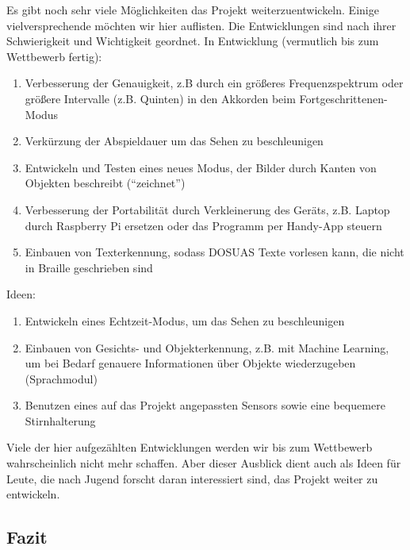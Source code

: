 \documentclass[a4paper,12pt,ngerman]{scrartcl}
\begin{document}
Es gibt noch sehr viele Möglichkeiten das Projekt weiterzuentwickeln. Einige vielversprechende
möchten wir hier auflisten. Die Entwicklungen sind nach ihrer Schwierigkeit und Wichtigkeit geordnet.
In Entwicklung (vermutlich bis zum Wettbewerb fertig):
\begin{enumerate}
	\item Verbesserung der Genauigkeit, z.B durch ein größeres Frequenzspektrum oder größere Intervalle (z.B. Quinten) in den
	 Akkorden beim Fortgeschrittenen-Modus
	\item Verkürzung der Abspieldauer um das Sehen zu beschleunigen
	\item Entwickeln und Testen eines neues Modus, der Bilder durch Kanten von Objekten beschreibt (\enquote{zeichnet}) 
	\item Verbesserung der Portabilität durch Verkleinerung des Geräts, z.B. Laptop durch Raspberry Pi ersetzen oder das Programm per
	Handy-App steuern
	\item Einbauen von Texterkennung, sodass DOSUAS Texte vorlesen kann, die nicht in Braille geschrieben sind
\end{enumerate}
Ideen:
\begin{enumerate} 
	\item Entwickeln eines Echtzeit-Modus, um das Sehen zu beschleunigen
	\item Einbauen von Gesichts- und Objekterkennung, z.B. mit Machine Learning, um bei Bedarf genauere 
	Informationen über Objekte wiederzugeben (Sprachmodul)
	\item Benutzen eines auf das Projekt angepassten Sensors sowie eine bequemere Stirnhalterung
\end{enumerate}
Viele der hier aufgezählten Entwicklungen werden wir bis zum Wettbewerb wahrscheinlich nicht 
mehr schaffen. Aber dieser Ausblick dient auch als Ideen für Leute, die nach Jugend forscht 
daran interessiert sind, das Projekt weiter zu entwickeln. 

\subsection{Fazit}
\end{document}
